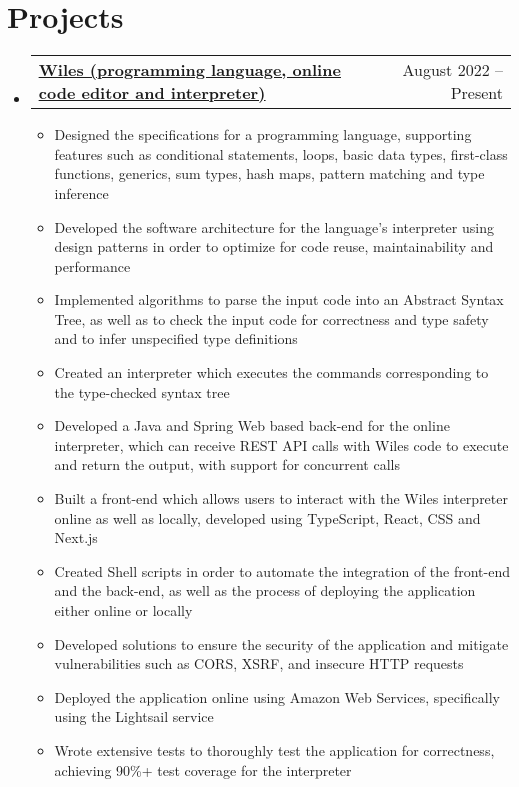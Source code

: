 \documentclass[letterpaper,11pt]{article}
\makeatletter
\newcommand{\resumeItem}[1]{
  \item\small{
    {#1 \vspace{-2pt}}
  }
}
\newcommand{\resumeProjectHeading}[2]{
    \item
    \begin{tabular*}{0.97\textwidth}{l@{\extracolsep{\fill}}r}
      \small#1 & #2 \\
    \end{tabular*}\vspace{-7pt}
}
\newcommand{\resumeSubHeadingListStart}{\begin{itemize}[leftmargin=0.15in, label={}]}
\newcommand{\resumeSubHeadingListEnd}{\end{itemize}}
\newcommand{\resumeItemListStart}{\begin{itemize}}
\newcommand{\resumeItemListEnd}{\end{itemize}\vspace{-5pt}}
\makeatother
\begin{document}
\section{Projects}
    \resumeSubHeadingListStart
      \resumeProjectHeading
          {\textbf{\href{https://wiles.costea.in/}{\underline{Wiles (programming language, online code editor and interpreter)}}}}{August 2022 -- Present}
          \resumeItemListStart
            \resumeItem{Designed the specifications for a programming language, supporting features such as conditional statements, loops, basic data types, first-class functions, generics, sum types, hash maps, pattern matching and type inference}
            \resumeItem{Developed the software architecture for the language's interpreter using design patterns in order to optimize for code reuse, maintainability and performance}
            \resumeItem{Implemented algorithms to parse the input code into an Abstract Syntax Tree, as well as to check the input code for correctness and type safety and to infer unspecified type definitions}
            \resumeItem{Created an interpreter which executes the commands corresponding to the type-checked syntax tree}
            \resumeItem{Developed a Java and Spring Web based back-end for the online interpreter, which can receive REST API calls with Wiles code to execute and return the output, with support for concurrent calls}
            \resumeItem{Built a front-end which allows users to interact with the Wiles interpreter online as well as locally, developed using TypeScript, React, CSS and Next.js}
            \resumeItem{Created Shell scripts in order to automate the integration of the front-end and the back-end, as well as the process of deploying the application either online or locally}
            \resumeItem{Developed solutions to ensure the security of the application and mitigate vulnerabilities such as CORS, XSRF, and insecure HTTP requests}
            \resumeItem{Deployed the application online using Amazon Web Services, specifically using the Lightsail service}
            \resumeItem{Wrote extensive tests to thoroughly test the application for correctness, achieving 90\%+ test coverage for the interpreter}

          \resumeItemListEnd
          
    \resumeSubHeadingListEnd



%
\end{document}

